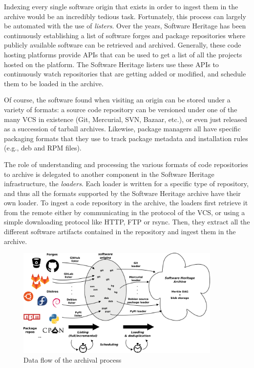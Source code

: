 Indexing every single software origin that exists in order to ingest them in
the archive would be an incredibly tedious task. Fortunately, this process can
largely be automated with the use of \emph{listers}. Over the years, Software
Heritage has been continuously establishing a list of software forges and
package repositories where publicly available software can be retrieved and
archived. Generally, these code hosting platforms provide APIs that can be used
to get a list of all the projects hosted on the platform. The Software Heritage
listers use these APIs to continuously watch repositories that are getting
added or modified, and schedule them to be loaded in the archive.

Of course, the software found when visiting an origin can be stored under a
variety of formats: a source code repository can be versioned under one of the
many \gls{VCS} in existence (Git, Mercurial, SVN, Bazaar, etc.), or even just
released as a succession of tarball archives. Likewise, package managers all
have specific packaging formats that they use to track package metadata and
installation rules (e.g., deb and RPM files).

The role of understanding and processing the various formats of code
repositories to archive is delegated to another component in the Software
Heritage infrastructure, the \emph{loaders}. Each loader is written for a
specific type of repository, and thus all the formats supported by the Software
Heritage archive have their own loader. To ingest a code repository in the
archive, the loaders first retrieve it from the remote either by communicating
in the protocol of the VCS, or using a simple downloading protocol like HTTP,
FTP or rsync. Then, they extract all the different software artifacts contained
in the repository and ingest them in the archive.

\begin{figure}
\begin{center}
    \includegraphics[width=0.9\textwidth]{../img/swh-dataflow}
\end{center}
\caption{Data flow of the archival process}%
\label{fig:archival-data-flow}
\end{figure}

